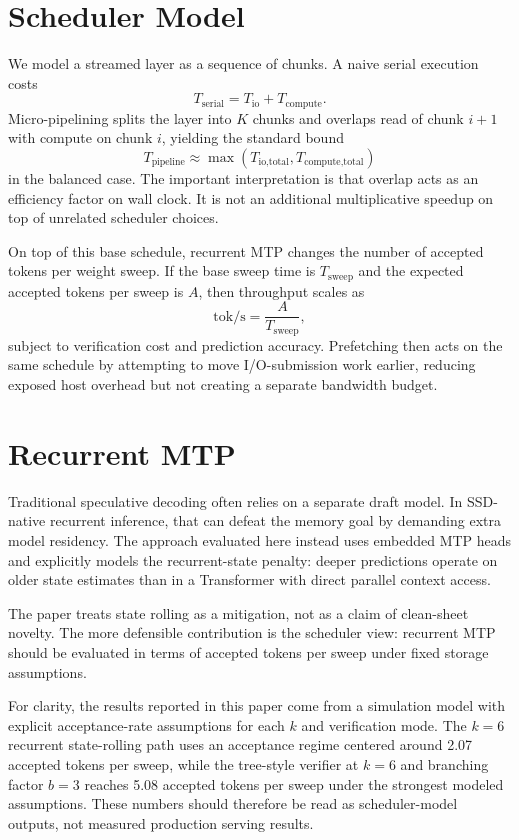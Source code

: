\documentclass[11pt]{article}
\begin{document}
\section{Scheduler Model}
We model a streamed layer as a sequence of chunks. A naive serial execution costs
\begin{equation}
T_{\text{serial}} = T_{\text{io}} + T_{\text{compute}}.
\end{equation}
Micro-pipelining splits the layer into $K$ chunks and overlaps read of chunk $i+1$ with compute on chunk $i$, yielding the standard bound
\begin{equation}
T_{\text{pipeline}} \approx \max(T_{\text{io,total}}, T_{\text{compute,total}})
\end{equation}
in the balanced case. The important interpretation is that overlap acts as an efficiency factor on wall clock. It is not an additional multiplicative speedup on top of unrelated scheduler choices.

On top of this base schedule, recurrent MTP changes the number of accepted tokens per weight sweep. If the base sweep time is $T_{\text{sweep}}$ and the expected accepted tokens per sweep is $A$, then throughput scales as
\begin{equation}
\text{tok/s} = \frac{A}{T_{\text{sweep}}},
\end{equation}
subject to verification cost and prediction accuracy. Prefetching then acts on the same schedule by attempting to move I/O-submission work earlier, reducing exposed host overhead but not creating a separate bandwidth budget.

\section{Recurrent MTP}
Traditional speculative decoding often relies on a separate draft model. In SSD-native recurrent inference, that can defeat the memory goal by demanding extra model residency. The approach evaluated here instead uses embedded MTP heads and explicitly models the recurrent-state penalty: deeper predictions operate on older state estimates than in a Transformer with direct parallel context access.

The paper treats state rolling as a mitigation, not as a claim of clean-sheet novelty. The more defensible contribution is the scheduler view: recurrent MTP should be evaluated in terms of accepted tokens per sweep under fixed storage assumptions.

For clarity, the results reported in this paper come from a simulation model with explicit acceptance-rate assumptions for each $k$ and verification mode. The $k=6$ recurrent state-rolling path uses an acceptance regime centered around 2.07 accepted tokens per sweep, while the tree-style verifier at $k=6$ and branching factor $b=3$ reaches 5.08 accepted tokens per sweep under the strongest modeled assumptions. These numbers should therefore be read as scheduler-model outputs, not measured production serving results.
\end{document}
